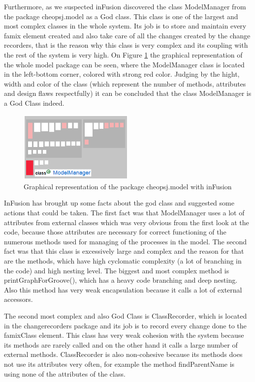 \documentclass{article}
\begin{document}
Furthermore, as we suspected inFusion discovered the class ModelManager from the package cheopsj.model as a God class. This class is one of the largest and most complex classes in the whole system. Its job is to store and maintain every famix element created and also take care of all the changes created by the change recorders, that is the reason why this class is very complex and its coupling with the rest of the system is very high. On Figure \ref{fig:spec2} the graphical representation of the whole model package can be seen, where the ModelManager class is located in the left-bottom corner, colored with strong red color. Judging by the hight, width and color of the class (which represent the number of methods, attributes and design flaws respectfully) it can be concluded that the class ModelManager is a God Class indeed.

\begin{figure}[h]
\centering
\includegraphics[width=0.5\textwidth]{Images/GodClassMM}
\caption{Graphical representation of the package cheopsj.model with inFusion}
\label{fig:spec2}
\end{figure}

InFusion has brought up some facts about the god class and suggested some actions that could be taken. The first fact was that ModelManager uses a lot of attributes from external classes which was very obvious from the first look at the code, because those attributes are necessary for correct functioning of the numerous methods used for managing of the processes in the model. The second fact was that this class is excessively large and complex and the reason for that are the methods, which have high cyclomatic complexity (a lot of branching in the code) and high nesting level. The biggest and most complex method is printGraphForGroove(), which has a heavy code branching and deep nesting. Also this method has very weak encapsulation because it calls a lot of external accessors.

The second most complex and also God Class is ClassRecorder, which is located in the changerecorders package and its job is to record every change done to the famixClass element. This class has very weak cohesion with the system because its methods are rarely called and on the other hand it calls a large number of external methods. ClassRecorder is also non-cohesive because its methods does not use its attributes very often, for example the method findParentName is using none of the attributes of the class.
\end{document}
